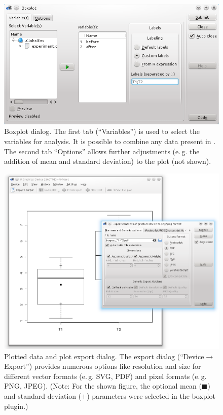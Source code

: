 \begin{figure}[htp]
 \centering
 \includegraphics[width=15.5cm]{../figures/boxplot1.png}
 \caption{Boxplot dialog. The first tab (``Variables'') is used to select the variables for analysis. It is possible to
  combine any data present in . The second tab ``Options'' allows further adjustments (e.\,g. the addition of mean and standard deviation) to the plot (not shown).}
 \label{fig:boxplot1}
\end{figure}


\begin{figure}[htp]
 \centering
 \includegraphics[width=15.5cm]{../figures/boxplot2.png}
 \caption{Plotted data and plot export dialog. The export dialog (``Device$\rightarrow$Export'') provides numerous 
  options like resolution and size for different vector formats (e.\,g. SVG, PDF) and 
  pixel formats (e.\,g. PNG, JPEG). (Note: For the shown figure, the optional  
  mean ($\blacksquare$) and standard deviation ($+$) parameters were selected in the boxplot plugin.)}
 \label{fig:boxplot2}
\end{figure}
